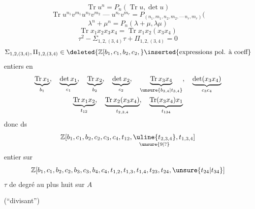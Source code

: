 \[\operatorname{Tr}u^n=P_n(\operatorname{Tr}u,\det u)\]
\[
\operatorname{Tr}u^{n_1}v^{m_1}u^{n_2}v^{m_2}\;\text{---}\;u^{n_r}v^{m_r}
=P_{(n_1,m_1,n_2,m_2,\text{---}\,n_r,m_r)}\bigl(
\]
\[\lambda^n+\mu^n=P_n(\lambda+\mu,\lambda\mu)\]
\[\operatorname{Tr}x_1x_2x_3x_4=\operatorname{Tr}x_1x_2(x_3x_4)\]
\[\tau^2-\Sigma_{1,2,(3,4)}\tau+\Pi_{1,2,(3,4)}=0\]
\[
\Sigma_{1,2,(3,4)},\Pi_{1,2,(3,4)}\in
\deleted{\mathbb Z[b_1,c_1,b_2,c_2,}
\inserted{\text{expressions pol. à coeff}}
\]
entiers en
\[
\begin{gathered}
\underbrace{\operatorname{Tr}x_1}_{b_1},\quad
\underbrace{\det x_1}_{c_1},\quad
\underbrace{\operatorname{Tr}x_2}_{b_2},\quad
\underbrace{\det x_2}_{c_2},\quad
\underbrace{\operatorname{Tr}x_3x_4}_{\unsure{b_{3,4}|t_{3,4}}},\quad
\underbrace{\det(x_3x_4)}_{c_3c_4}\\
\underbrace{\operatorname{Tr}x_1x_2}_{t_{12}},\quad
\underbrace{\operatorname{Tr}x_2(x_3x_4)}_{t_{2,3,4}},\quad
\underbrace{\operatorname{Tr}(x_3x_4)x_1}_{t_{134}}
\end{gathered}
\]
donc ds
\[
\mathbb Z[b_1,c_1,b_2,c_2,c_3,c_4,t_{12},
\underset{\unsure{9|?}}{\uline{t_{2,3,4}}},t_{1,3,4}]
\]
entier sur
\[
\mathbb Z[b_1,c_1,b_2,c_2,b_3,c_3,b_4,c_4,t_{1,2},t_{1,3},t_{1,4},
 t_{23},t_{24},\unsure{t_{24}|t_{34}}]
\]
$\tau$ de degré au plus huit sur $A$

\hspace{2em}(``\quad divisant\quad '')
